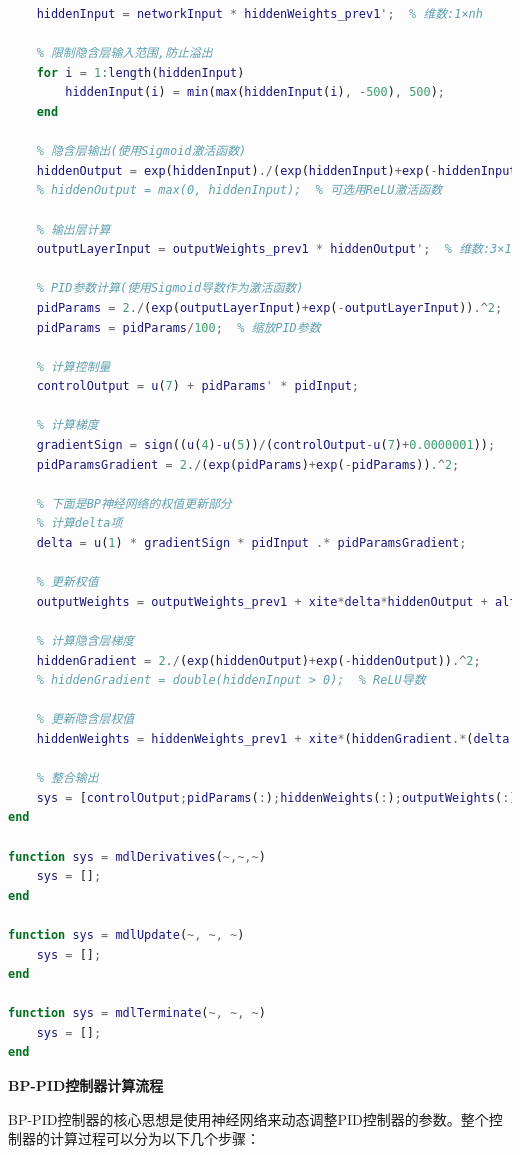 \documentclass[12pt,a4paper,UTF8]{article}
\begin{document}
\begin{lstlisting}[language=Matlab,caption=BPD-PID控制器实现]
    % 计算隐含层输入
    hiddenInput = networkInput * hiddenWeights_prev1';  % 维数:1×nh
    
    % 限制隐含层输入范围,防止溢出
    for i = 1:length(hiddenInput)
        hiddenInput(i) = min(max(hiddenInput(i), -500), 500);
    end
    
    % 隐含层输出(使用Sigmoid激活函数)
    hiddenOutput = exp(hiddenInput)./(exp(hiddenInput)+exp(-hiddenInput));
    % hiddenOutput = max(0, hiddenInput);  % 可选用ReLU激活函数
    
    % 输出层计算
    outputLayerInput = outputWeights_prev1 * hiddenOutput';  % 维数:3×1
    
    % PID参数计算(使用Sigmoid导数作为激活函数)
    pidParams = 2./(exp(outputLayerInput)+exp(-outputLayerInput)).^2;
    pidParams = pidParams/100;  % 缩放PID参数
    
    % 计算控制量
    controlOutput = u(7) + pidParams' * pidInput;
    
    % 计算梯度
    gradientSign = sign((u(4)-u(5))/(controlOutput-u(7)+0.0000001));
    pidParamsGradient = 2./(exp(pidParams)+exp(-pidParams)).^2;
    
    % 下面是BP神经网络的权值更新部分
    % 计算delta项
    delta = u(1) * gradientSign * pidInput .* pidParamsGradient;
    
    % 更新权值
    outputWeights = outputWeights_prev1 + xite*delta*hiddenOutput + alfa*(outputWeights_prev1-outputWeights_prev2);
    
    % 计算隐含层梯度
    hiddenGradient = 2./(exp(hiddenOutput)+exp(-hiddenOutput)).^2;
    % hiddenGradient = double(hiddenInput > 0);  % ReLU导数
    
    % 更新隐含层权值
    hiddenWeights = hiddenWeights_prev1 + xite*(hiddenGradient.*(delta'*outputWeights))'*networkInput + alfa*(hiddenWeights_prev1-hiddenWeights_prev2);
    
    % 整合输出
    sys = [controlOutput;pidParams(:);hiddenWeights(:);outputWeights(:)];
end

function sys = mdlDerivatives(~,~,~)
    sys = [];
end

function sys = mdlUpdate(~, ~, ~)
    sys = [];
end

function sys = mdlTerminate(~, ~, ~)
    sys = [];
end
\end{lstlisting}

\textbf{BP-PID控制器计算流程}

BP-PID控制器的核心思想是使用神经网络来动态调整PID控制器的参数。整个控制器的计算过程可以分为以下几个步骤：
\end{document}
